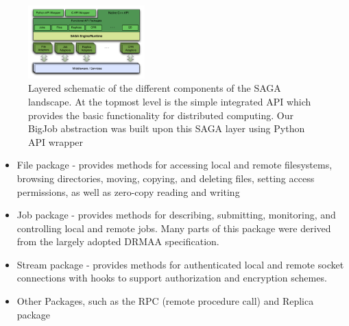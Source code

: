 \documentclass[conference,final]{IEEEtran}
\newcommand{\skonote}[1]{ {\textcolor{blue} { ***Jeff: #1 }}}
\newcommand{\skonote}[1]{}
\begin{document}
\begin{figure}[!ht]
 \begin{center}
     \includegraphics[width=0.40\textwidth]{stci_saga_figures-1.pdf}
 \end{center}
\caption{\small Layered schematic of the different components
  of the SAGA landscape. At the topmost level is the simple integrated API which provides the basic functionality for distributed computing. Our BigJob abstraction was built upon this SAGA layer using Python API wrapper} \label{sagalayer}
\end{figure}



\begin{itemize}
\item File package - provides methods for accessing local and remote
 filesystems, browsing directories, moving, copying, and deleting
 files, setting access permissions, as well as zero-copy reading and
 writing
\item Job package - provides methods for describing, submitting,
 monitoring, and controlling local and remote jobs. Many parts of
 this package were derived from the largely adopted
 DRMAA %
 specification.
\item Stream package - provides methods for authenticated local and
 remote socket connections with hooks to support authorization and
 encryption schemes.
\item Other Packages, such as the RPC (remote procedure call) and Replica
 package
\end{itemize}





\end{document}
